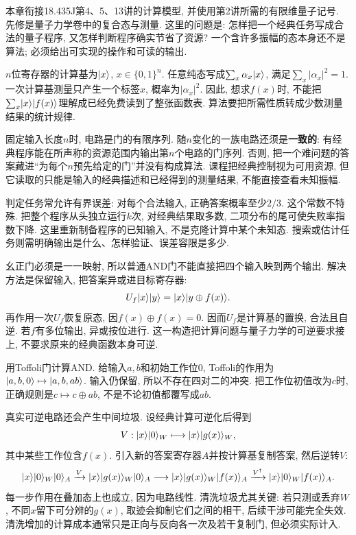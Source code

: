 本章衔接18.435J第4、5、13讲的计算模型, 并使用第2讲所需的有限维量子记号. 先修是量子力学卷中的复合态与测量. 这里的问题是: 怎样把一个经典任务写成合法的量子程序, 又怎样判断程序确实节省了资源? 一个含许多振幅的态本身还不是算法; 必须给出可实现的操作和可读的输出.

$n$位寄存器的计算基为$\lvert x\rangle$, $x\in\{0,1\}^n$. 任意纯态写成$\sum_x\alpha_x\lvert x\rangle$, 满足$\sum_x|\alpha_x|^2=1$. 一次计算基测量只产生一个标签$x$, 概率为$|\alpha_x|^2$. 因此, 想求$f(x)$时, 不能把$\sum_x\lvert x\rangle\lvert f(x)\rangle$理解成已经免费读到了整张函数表. 算法要把所需性质转成少数测量结果的统计规律.

固定输入长度$n$时, 电路是门的有限序列. 随$n$变化的一族电路还须是\textbf{一致的}: 有经典程序能在所声称的资源范围内输出第$n$个电路的门序列. 否则, 把一个难问题的答案藏进“为每个$n$预先给定的门”并没有构成算法. 课程把经典控制视为可用资源, 但它读取的只能是输入的经典描述和已经得到的测量结果, 不能直接查看未知振幅.

判定任务常允许有界误差: 对每个合法输入, 正确答案概率至少$2/3$. 这个常数不特殊. 把整个程序从头独立运行$k$次, 对经典结果取多数, 二项分布的尾可使失败率指数下降. 这里重新制备程序的已知输入, 不是克隆计算中某个未知态. 搜索或估计任务则需明确输出是什么、怎样验证、误差容限是多少.

幺正门必须是一一映射, 所以普通AND门不能直接把四个输入映到两个输出. 解决方法是保留输入, 把答案异或进目标寄存器:
\[U_f\lvert x\rangle\lvert y\rangle=\lvert x\rangle\lvert y\oplus f(x)\rangle.\]
再作用一次$U_f$恢复原态, 因$f(x)\oplus f(x)=0$. 因而$U_f$是计算基的置换, 合法且自逆. 若$f$有多位输出, 异或按位进行. 这一构造把计算问题与量子力学的可逆要求接上, 不要求原来的经典函数本身可逆.

\begin{example}用Toffoli门计算AND. 给输入$a,b$和初始工作位$0$, Toffoli的作用为$\lvert a,b,0\rangle\mapsto\lvert a,b,ab\rangle$. 输入仍保留, 所以不存在四对二的冲突. 把工作位初值改为$c$时, 正确规则是$c\mapsto c\oplus ab$, 不是不论初值都覆写成$ab$.\end{example}

真实可逆电路还会产生中间垃圾. 设经典计算可逆化后得到
\[V:\lvert x\rangle\lvert 0\rangle_W\longmapsto\lvert x\rangle\lvert g(x)\rangle_W,\]
其中某些工作位含$f(x)$. 引入新的答案寄存器$A$并按计算基复制答案, 然后逆转$V$:
\[\lvert x\rangle\lvert 0\rangle_W\lvert 0\rangle_A\xrightarrow{V}\lvert x\rangle\lvert g(x)\rangle_W\lvert 0\rangle_A
\longrightarrow\lvert x\rangle\lvert g(x)\rangle_W\lvert f(x)\rangle_A
\xrightarrow{V^\dagger}\lvert x\rangle\lvert 0\rangle_W\lvert f(x)\rangle_A.\]
每一步作用在叠加态上也成立, 因为电路线性. 清洗垃圾尤其关键: 若只测或丢弃$W$, 不同$x$留下可分辨的$g(x)$, 取迹会抑制它们之间的相干, 后续干涉可能完全失效. 清洗增加的计算成本通常只是正向与反向各一次及若干复制门, 但必须实际计入.

